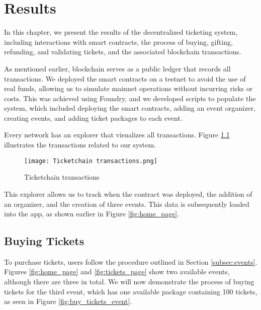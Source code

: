 \chapter{Results}
\label{ch:results}

In this chapter, we present the results of the decentralized ticketing system,
including interactions with smart contracts, the process of buying, gifting,
refunding, and validating tickets, and the associated blockchain transactions.


As mentioned earlier, blockchain serves as a public ledger that records all
transactions. We deployed the smart contracts on a testnet to avoid the use of
real funds, allowing us to simulate mainnet operations without incurring risks
or costs. This was achieved using Foundry, and we developed scripts to populate
the system, which included deploying the smart contracts, adding an event
organizer, creating events, and adding ticket packages to each event.

Every network has an explorer that visualizes all transactions. Figure
\ref{fig:ticketchain_transactions} illustrates the transactions related to our
system.
\begin{figure}[H]
    \texttt{[image: Ticketchain transactions.png]}
    \centering
    \caption{Ticketchain transactions}
    \label{fig:ticketchain_transactions}
\end{figure}

This explorer allows us to track when the contract was deployed, the addition
of an organizer, and the creation of three events. This data is subsequently
loaded into the app, as shown earlier in Figure \ref{fig:home_page}.

\section{Buying Tickets}
\label{sec:buy_tickets}

To purchase tickets, users follow the procedure outlined in Section
\ref{subsec:events}. Figures \ref{fig:home_page} and \ref{fig:tickets_page}
show two available events, although there are three in total. We will now
demonstrate the process of buying tickets for the third event, which has one
available package containing 100 tickets, as seen in Figure
\ref{fig:buy_tickets_event}.

